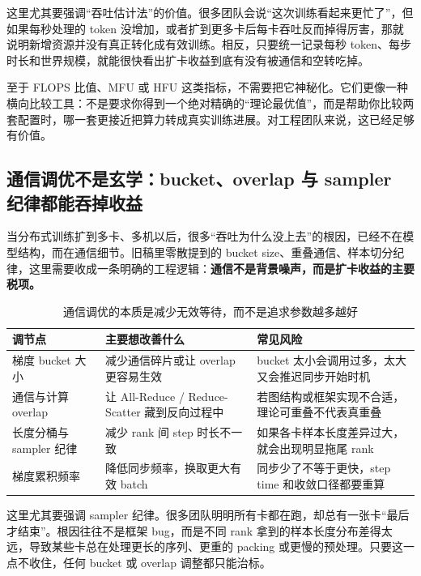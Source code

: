这里尤其要强调“吞吐估计法”的价值。很多团队会说“这次训练看起来更忙了”，但如果每秒处理的 token 没增加，或者扩到更多卡后每卡吞吐反而掉得厉害，那就说明新增资源并没有真正转化成有效训练。相反，只要统一记录每秒 token、每步时长和世界规模，就能很快看出扩卡收益到底有没有被通信和空转吃掉。

至于 FLOPS 比值、MFU 或 HFU 这类指标，不需要把它神秘化。它们更像一种{\heiti 横向比较工具}：不是要求你得到一个绝对精确的“理论最优值”，而是帮助你比较两套配置时，哪一套更接近把算力转成真实训练进展。对工程团队来说，这已经足够有价值。

\subsection{通信调优不是玄学：bucket、overlap 与 sampler 纪律都能吞掉收益}
当分布式训练扩到多卡、多机以后，很多“吞吐为什么没上去”的根因，已经不在模型结构，而在通信细节。旧稿里零散提到的 bucket size、重叠通信、样本切分纪律，这里需要收成一条明确的工程逻辑：\textbf{通信不是背景噪声，而是扩卡收益的主要税项。}

\begin{table}[H]
\centering
\small
\begin{tabularx}{\textwidth}{>{\raggedright\arraybackslash}p{2.8cm}>{\raggedright\arraybackslash}p{3cm}>{\raggedright\arraybackslash}X}
\toprule
\textbf{调节点} & \textbf{主要想改善什么} & \textbf{常见风险} \\
\midrule
梯度 bucket 大小 & 减少通信碎片或让 overlap 更容易生效 & bucket 太小会调用过多，太大又会推迟同步开始时机 \\
通信与计算 overlap & 让 All-Reduce / Reduce-Scatter 藏到反向过程中 & 若图结构或框架实现不合适，理论可重叠不代表真重叠 \\
长度分桶与 sampler 纪律 & 减少 rank 间 step 时长不一致 & 如果各卡样本长度差异过大，就会出现明显拖尾 rank \\
梯度累积频率 & 降低同步频率，换取更大有效 batch & 同步少了不等于更快，step time 和收敛口径都要重算 \\
\bottomrule
\end{tabularx}
\caption{通信调优的本质是减少无效等待，而不是追求参数越多越好}
\label{tab:communication-tuning}
\end{table}

这里尤其要强调 sampler 纪律。很多团队明明所有卡都在跑，却总有一张卡“最后才结束”。根因往往不是框架 bug，而是不同 rank 拿到的样本长度分布差得太远，导致某些卡总在处理更长的序列、更重的 packing 或更慢的预处理。只要这一点不收住，任何 bucket 或 overlap 调整都只能治标。

